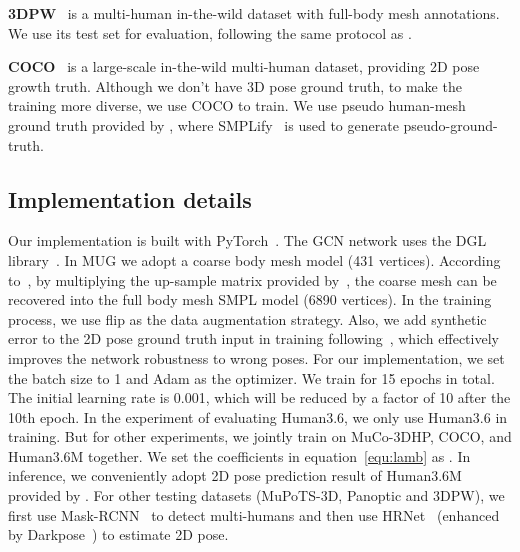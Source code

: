 \documentclass[runningheads]{llncs}
\begin{document}
\noindent\textbf{3DPW}~\cite{von2018recovering} is a multi-human in-the-wild dataset with full-body mesh annotations. We use its test set for evaluation, following the same protocol as \cite{kocabas2020vibe}.

\noindent\textbf{COCO}~\cite{lin2014microsoft} is a large-scale in-the-wild multi-human dataset, providing 2D pose growth truth. Although we don’t have 3D pose ground truth, to make the training more diverse, we use COCO to train. We use pseudo human-mesh ground truth provided by \cite{moon2020i2l}, where SMPLify~\cite{pavlakos2019expressive} is used to generate pseudo-ground-truth. 
\subsection{Implementation details}\label{subsection:details}
Our implementation is built with PyTorch~\cite{pytorch}. The GCN network uses the DGL library~\cite{dgl}. 
In MUG we adopt a coarse body mesh model (431 vertices). 
According to~\cite{ranjan2018generating}, by multiplying the up-sample matrix provided by~\cite{ranjan2018generating}, the coarse mesh can be recovered into the full body mesh SMPL model (6890 vertices). 
In the training process, we use flip as the data augmentation strategy. 
Also, we add synthetic error to the 2D pose ground truth input in training following~\cite{moon2019posefix,choi2020pose2mesh}, which effectively improves the network robustness to wrong poses.
For our implementation, we set the batch size to 1 and  Adam as the optimizer. We train for 15 epochs in total. The initial learning rate is 0.001, which will be reduced by a factor of 10 after the 10th epoch. In the experiment of evaluating Human3.6, we only use Human3.6 in training. But for other experiments, we jointly train on MuCo-3DHP, COCO, and Human3.6M together. We set the coefficients in equation~\ref{equ:lamb} as . In inference, we conveniently adopt 2D pose prediction result of Human3.6M provided by \cite{choi2020pose2mesh}. For other testing datasets (MuPoTS-3D, Panoptic and 3DPW), we first use Mask-RCNN~\cite{he2017mask} to detect multi-humans and then use HRNet~\cite{sun2019deep} (enhanced by Darkpose~\cite{zhang2020distribution}) to estimate 2D pose.
\end{document}
